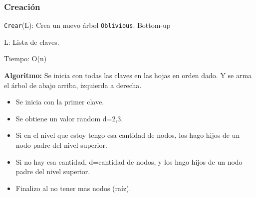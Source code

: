 \documentclass[10pt]{beamer}
\begin{document}
\begin{frame}
\frametitle{Creación}

\texttt{Crear}(L): Crea un nuevo árbol \texttt{Oblivious}. Bottom-up

  L: Lista de claves.

  Tiempo: O(n)

\pause
\textbf{Algoritmo:}
  Se inicia con todas las claves en las hojas en orden dado.
  Y se arma el árbol de abajo arriba, izquierda a derecha.

\pause
\begin{itemize}\itemsep-1em
  \item Se inicia con la primer clave.
  \item Se obtiene un valor random d={2,3}.
\pause
  \item Si en el nivel que estoy tengo esa cantidad de nodos, los hago hijos de
    un nodo padre del nivel superior.
  \item Si no hay esa cantidad, d=cantidad de nodos, y los hago hijos de un nodo
    padre del nivel superior.
\pause
  \item Finalizo al no tener mas nodos (raíz).
\end{itemize}

\end{frame}

\end{document}
